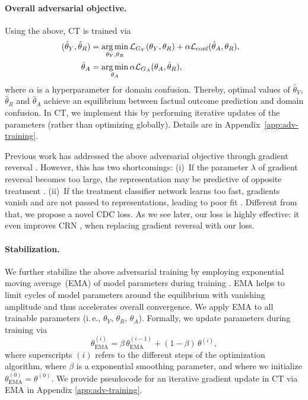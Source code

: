 \documentclass{article}
\newcommand\ie{i.\,e.\xspace}
\theoremstyle{plain}
\theoremstyle{definition}
\theoremstyle{remark}
\DeclareMathOperator*{\argmin}{arg\,min}
\newcommand{\shortname}{CT\xspace}
\begin{document}
\paragraph{Overall adversarial objective.} 

Using the above, \shortname is trained via
\begin{align}
\hspace{-0.3cm}    
(\hat{\theta}_Y, \hat{\theta}_R) & = \argmin_{\theta_Y, \theta_R} \mathcal{L}_{G_Y} (\theta_Y, \theta_R) + \alpha \mathcal{L}_{\text{conf}} (\hat{\theta}_A, \theta_R) , \label{eq:loss-yr}\\ 
    \hat{\theta}_A & = \argmin_{\theta_A} \alpha \mathcal{L}_{G_A} (\theta_A, \hat{\theta}_R)  , \label{eq:loss-a}
\end{align}
where $\alpha$ is a hyperparameter for domain confusion. Thereby, optimal values of $\hat{\theta}_Y$, $\hat{\theta}_R$ and $\hat{\theta}_A$ achieve an equilibrium between factual outcome prediction and domain confusion. In \shortname, we implement this by performing iterative updates of the parameters (rather than optimizing globally). Details are in Appendix~\ref{app:adv-training}.  

Previous work \cite{bica2020estimating} has addressed the above adversarial objective through gradient reversal \cite{ganin2015unsupervised}. However, this has two shortcomings: (i)~If the parameter $\lambda$ of gradient reversal becomes too large, the representation may be predictive of opposite treatment \cite{atan2018counterfactual}. (ii)~If the treatment classifier network learns too fast, gradients vanish and are not passed to representations, leading to poor fit \cite{tzeng2017adversarial}. Different from that, we propose a novel CDC loss. As we see later, our loss is highly effective: it even improves CRN \cite{bica2020estimating}, when replacing gradient reversal with our loss.



\paragraph{Stabilization.} 

We further stabilize the above adversarial training by employing exponential moving average~(EMA) of model parameters during training \cite{yaz2018unusual}. EMA helps to limit cycles of model parameters around the equilibrium with vanishing amplitude and thus accelerates overall convergence. We apply EMA to all trainable parameters (\ie, $\theta_Y$, $\theta_R$, $\theta_A$). Formally, we update parameters during training via 
\begin{equation}
\theta^{(i)}_{\text{EMA}} = \beta \, \theta^{(i - 1)}_{\text{EMA}} + (1 - \beta) \, \theta^{(i)} ,
\end{equation}
where superscripts $(i)$ refers to the different steps of the optimization algorithm, where $\beta$ is a exponential smoothing parameter, and where we initialize $\theta^{(0)}_{\text{EMA}} = \theta^{(0)}$. We provide pseudocode for an iterative gradient update in \shortname via EMA in Appendix \ref{app:adv-training}.
\end{document}

